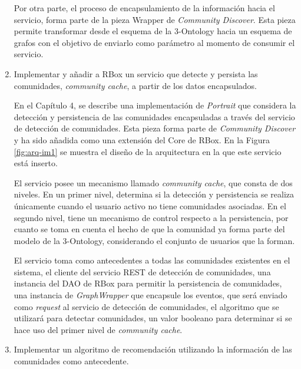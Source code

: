 \begin{enumerate}
  Por otra parte, el proceso de encapsulamiento de la información hacia el servicio, forma parte de la pieza Wrapper de \textit{Community Discover}. Esta pieza permite transformar desde el esquema de la 3-Ontology hacia un esquema de grafos con el objetivo de enviarlo como parámetro al momento de consumir el servicio. \newline

  \item Implementar y añadir a RBox un servicio que detecte y persista las comunidades, \textit{community cache}, a partir de los datos encapsulados. \newline

  En el Capítulo 4, se describe una implementación de \textit{Portrait} que considera la detección y persistencia de las comunidades encapsuladas a través del servicio de detección de comunidades. Esta pieza forma parte de \textit{Community Discover} y ha sido añadida como una extensión del Core de RBox. En la Figura \ref{fig:arq-im1} se muestra el diseño de la arquitectura en la que este servicio está inserto. \newline

  El servicio posee un mecanismo llamado \textit{community cache}, que consta de dos niveles. En un primer nivel, determina si la detección y persistencia se realiza únicamente cuando el usuario activo no tiene comunidades asociadas. En el segundo nivel, tiene un mecanismo de control respecto a la persistencia, por cuanto se toma en cuenta el hecho de que la comunidad ya forma parte del modelo de la 3-Ontology, considerando el conjunto de usuarios que la forman. \newline

  El servicio toma como antecedentes a todas las comunidades existentes en el sistema, el cliente del servicio REST de detección de comunidades, una instancia del DAO de RBox para permitir la persistencia de comunidades, una instancia de \textit{\textit{Graph}Wrapper} que encapsule los eventos, que será enviado como \textit{request} al servicio de detección de comunidades, el algoritmo que se utilizará para detectar comunidades, un valor booleano para determinar si se hace uso del primer nivel de \textit{community cache}. \newline

  \item Implementar un algoritmo de recomendación utilizando la información de las comunidades como antecedente. \newline


\end{enumerate}
